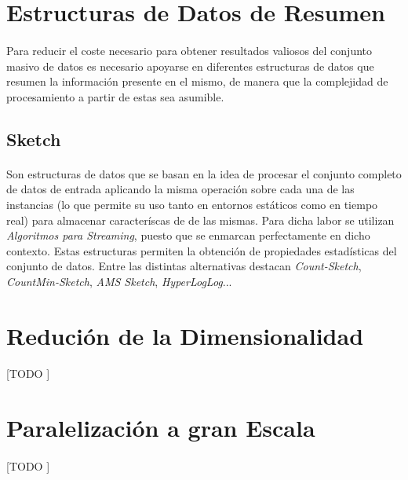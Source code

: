 \documentclass{article}
\begin{document}
  \section{Estructuras de Datos de Resumen}

    \paragraph{}
    Para reducir el coste necesario para obtener resultados valiosos del conjunto masivo de datos es necesario apoyarse en diferentes estructuras de datos que resumen la información presente en el mismo, de manera que la complejidad de procesamiento a partir de estas sea asumible.

    \subsection{Sketch}

      \paragraph{}
      Son estructuras de datos que se basan en la idea de procesar el conjunto completo de datos de entrada aplicando la misma operación sobre cada una de las instancias (lo que permite su uso tanto en entornos estáticos como en tiempo real) para almacenar caracteríscas de de las mismas. Para dicha labor se utilizan \emph{Algoritmos para Streaming}, puesto que se enmarcan perfectamente en dicho contexto. Estas estructuras permiten la obtención de propiedades estadísticas del conjunto de datos. Entre las distintas alternativas destacan \emph{Count-Sketch}, \emph{CountMin-Sketch}, \emph{AMS Sketch}, \emph{HyperLogLog}...

  \section{Redución de la Dimensionalidad}

    \paragraph{}
    [TODO ]

  \section{Paralelización a gran Escala}

    \paragraph{}
    [TODO ]
\end{document}
